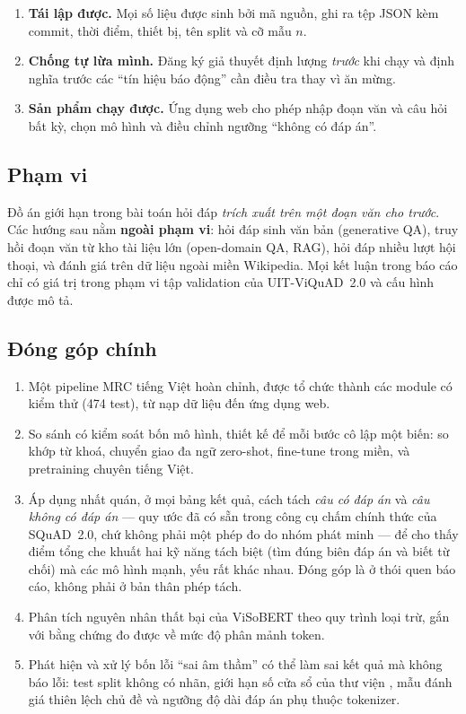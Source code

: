 \begin{enumerate}
  \item \textbf{Tái lập được.} Mọi số liệu được sinh bởi mã nguồn, ghi ra tệp JSON kèm
        commit, thời điểm, thiết bị, tên split và cỡ mẫu $n$.
  \item \textbf{Chống tự lừa mình.} Đăng ký giả thuyết định lượng \emph{trước} khi chạy
        và định nghĩa trước các ``tín hiệu báo động'' cần điều tra thay vì ăn mừng.
  \item \textbf{Sản phẩm chạy được.} Ứng dụng web cho phép nhập đoạn văn và câu hỏi
        bất kỳ, chọn mô hình và điều chỉnh ngưỡng ``không có đáp án''.
\end{enumerate}

\subsection{Phạm vi}

Đồ án giới hạn trong bài toán hỏi đáp \emph{trích xuất trên một đoạn văn cho trước}.
Các hướng sau nằm \textbf{ngoài phạm vi}: hỏi đáp sinh văn bản (generative QA), truy hồi
đoạn văn từ kho tài liệu lớn (open-domain QA, RAG), hỏi đáp nhiều lượt hội thoại, và
đánh giá trên dữ liệu ngoài miền Wikipedia. Mọi kết luận trong báo cáo chỉ có giá trị
trong phạm vi tập validation của UIT-ViQuAD~2.0 và cấu hình được mô tả.

\subsection{Đóng góp chính}

\begin{enumerate}
  \item Một pipeline MRC tiếng Việt hoàn chỉnh, được tổ chức thành các module có kiểm
        thử (474 test), từ nạp dữ liệu đến ứng dụng web.
  \item So sánh có kiểm soát bốn mô hình, thiết kế để mỗi bước cô lập một biến: so
        khớp từ khoá, chuyển giao đa ngữ zero-shot, fine-tune trong miền, và pretraining
        chuyên tiếng Việt.
  \item Áp dụng nhất quán, ở mọi bảng kết quả, cách tách \emph{câu có đáp án} và \emph{câu
        không có đáp án} --- quy ước đã có sẵn trong công cụ chấm chính thức của SQuAD~2.0,
        chứ không phải một phép đo do nhóm phát minh --- để cho thấy điểm tổng che khuất hai
        kỹ năng tách biệt (tìm đúng biên đáp án và biết từ chối) mà các mô hình mạnh, yếu rất
        khác nhau. Đóng góp là ở thói quen báo cáo, không phải ở bản thân phép tách.
  \item Phân tích nguyên nhân thất bại của ViSoBERT theo quy trình loại trừ, gắn với
        bằng chứng đo được về mức độ phân mảnh token.
  \item Phát hiện và xử lý bốn lỗi ``sai âm thầm'' có thể làm sai kết quả mà không báo
        lỗi: test split không có nhãn, giới hạn số cửa sổ của thư viện
        , mẫu đánh giá thiên lệch chủ đề và ngưỡng độ dài đáp án
        phụ thuộc tokenizer.
\end{enumerate}

